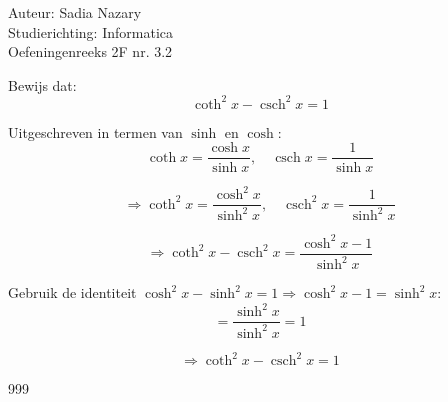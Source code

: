 \documentclass[a4paper]{article}
\begin{document}
\newcommand{\csch}{\operatorname{csch}}
\newcommand{\coth}{\operatorname{coth}}

\noindent \large Auteur: Sadia Nazary \\
\noindent \large Studierichting: Informatica \\
\noindent \large Oefeningenreeks 2F nr. 3.2 \\

\medskip

\normalsize

\noindent Bewijs dat: \\

$$
\coth^2 x - \csch^2 x = 1
$$

\noindent Uitgeschreven in termen van $ \sinh $ en $ \cosh $: \\

$$
\coth x = \dfrac{\cosh x}{\sinh x}, \quad \csch x = \dfrac{1}{\sinh x}
$$

$$
\Rightarrow \coth^2 x = \dfrac{\cosh^2 x}{\sinh^2 x}, \quad \csch^2 x = \dfrac{1}{\sinh^2 x}
$$

$$
\Rightarrow \coth^2 x - \csch^2 x = \dfrac{\cosh^2 x - 1}{\sinh^2 x}
$$

\noindent Gebruik de identiteit $ \cosh^2 x - \sinh^2 x = 1 \Rightarrow \cosh^2 x - 1 = \sinh^2 x $: \\

$$
= \dfrac{\sinh^2 x}{\sinh^2 x} = 1
$$

$$
\Rightarrow \coth^2 x - \csch^2 x = 1
$$

\begin{thebibliography}{999}


\end{thebibliography}
\end{document}
